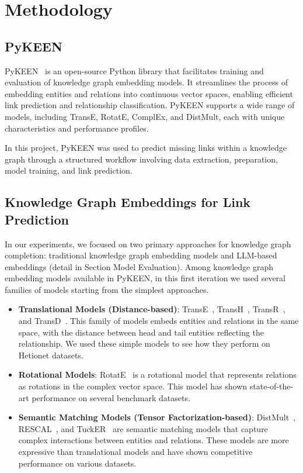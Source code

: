 \section*{Methodology}

\subsection*{PyKEEN}

PyKEEN~\cite{pykeen} is an open-source Python library that facilitates training and evaluation of knowledge graph embedding models.
It streamlines the process of embedding entities and relations into continuous vector spaces, enabling efficient link prediction and relationship classification.
PyKEEN supports a wide range of models, including TransE, RotatE, ComplEx, and DistMult, each with unique characteristics and performance profiles.

In this project, PyKEEN was used to predict missing links within a knowledge graph through a structured workflow involving data extraction, preparation, model training, and link prediction.

\subsection*{Knowledge Graph Embeddings for Link Prediction}

In our experiments, we focused on two primary approaches for knowledge graph completion: traditional knowledge graph embedding models and LLM-based embeddings (detail in Section Model Evaluation). Among knowledge graph embedding models available in PyKEEN, in this first iteration we used several families of models starting from the simplest approaches.
\begin{itemize}
    \item \textbf{Translational Models (Distance-based)}: TransE~\cite{10.5555/2999792.2999923}, TransH~\cite{10.5555/2893873.2894046}, TransR~\cite{10.5555/2886521.2886624}, and TransD~\cite{ji-etal-2015-knowledge}.
    This family of models embeds entities and relations in the same space, with the distance between head and tail entities reflecting the relationship. We used these simple models to see how they perform on Hetionet datasets.
    \item \textbf{Rotational Models}: RotatE~\cite{sun2019rotateknowledgegraphembedding} is a rotational model that represents relations as rotations in the complex vector space. This model has shown state-of-the-art performance on several benchmark datasets.
    \item \textbf{Semantic Matching Models (Tensor Factorization-based)}: DistMult~\cite{yang2015embeddingentitiesrelationslearning }, RESCAL~\cite{10.5555/3104482.3104584}, and TuckER~\cite{Balazevic_2019} are semantic matching models that capture complex interactions between entities and relations. These models are more expressive than translational models and have shown competitive performance on various datasets.
\end{itemize}


